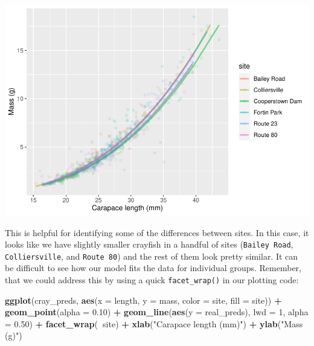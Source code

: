 \documentclass[
]{book}
\newenvironment{Shaded}{\begin{snugshade}}{\end{snugshade}}
\newcommand{\DataTypeTok}[1]{\textcolor[rgb]{0.13,0.29,0.53}{#1}}
\newcommand{\DecValTok}[1]{\textcolor[rgb]{0.00,0.00,0.81}{#1}}
\newcommand{\FloatTok}[1]{\textcolor[rgb]{0.00,0.00,0.81}{#1}}
\newcommand{\KeywordTok}[1]{\textcolor[rgb]{0.13,0.29,0.53}{\textbf{#1}}}
\newcommand{\NormalTok}[1]{#1}
\newcommand{\OperatorTok}[1]{\textcolor[rgb]{0.81,0.36,0.00}{\textbf{#1}}}
\newcommand{\StringTok}[1]{\textcolor[rgb]{0.31,0.60,0.02}{#1}}
\begin{document}
\includegraphics{worstr_files/figure-latex/unnamed-chunk-381-1.pdf}

This is helpful for identifying some of the differences between sites. In this case, it looks like we have slightly smaller crayfish in a handful of sites (\texttt{Bailey\ Road}, \texttt{Colliersville}, and \texttt{Route\ 80}) and the rest of them look pretty similar. It can be difficult to see how our model fits the data for individual groups. Remember, that we could address this by using a quick \texttt{facet\_wrap()} in our plotting code:

\begin{Shaded}
\begin{Highlighting}[]
\KeywordTok{ggplot}\NormalTok{(cray_preds, }\KeywordTok{aes}\NormalTok{(}\DataTypeTok{x =}\NormalTok{ length, }\DataTypeTok{y =}\NormalTok{ mass, }\DataTypeTok{color =}\NormalTok{ site, }\DataTypeTok{fill =}\NormalTok{ site)) }\OperatorTok{+}
\StringTok{  }\KeywordTok{geom_point}\NormalTok{(}\DataTypeTok{alpha =} \FloatTok{0.10}\NormalTok{) }\OperatorTok{+}
\StringTok{  }\KeywordTok{geom_line}\NormalTok{(}\KeywordTok{aes}\NormalTok{(}\DataTypeTok{y =}\NormalTok{ real_preds), }\DataTypeTok{lwd =} \DecValTok{1}\NormalTok{, }\DataTypeTok{alpha =} \FloatTok{0.50}\NormalTok{) }\OperatorTok{+}
\StringTok{  }\KeywordTok{facet_wrap}\NormalTok{(}\OperatorTok{~}\NormalTok{site) }\OperatorTok{+}
\StringTok{  }\KeywordTok{xlab}\NormalTok{(}\StringTok{"Carapace length (mm)"}\NormalTok{) }\OperatorTok{+}
\StringTok{  }\KeywordTok{ylab}\NormalTok{(}\StringTok{"Mass (g)"}\NormalTok{)}
\end{Highlighting}
\end{Shaded}
\end{document}

